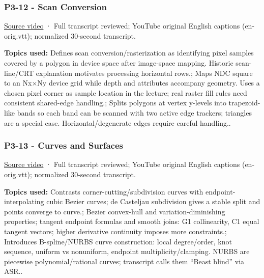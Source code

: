 \subsubsection{P3-12 - Scan Conversion}\label{04-visual-computing-ii-ch036-p3-12---scan-conversion}

\hypertarget{04-visual-computing-ii-ch036-p3-12---scan-conversion}{}

\href{https://www.youtube.com/watch?v=23HEwdcphg4}{Source video} · Full transcript reviewed; YouTube original English captions (en-orig.vtt); normalized 30-second transcript.

\textbf{Topics used:} Defines scan conversion/rasterization as identifying pixel samples covered by a polygon in device space after image-space mapping. Historic scan-line/CRT explanation motivates processing horizontal rows.; Maps NDC square to an Nx×Ny device grid while depth and attributes accompany geometry. Uses a chosen pixel corner as sample location in the lecture; real raster fill rules need consistent shared-edge handling.; Splits polygons at vertex y-levels into trapezoid-like bands so each band can be scanned with two active edge trackers; triangles are a special case. Horizontal/degenerate edges require careful handling..

\subsubsection{P3-13 - Curves and Surfaces}\label{04-visual-computing-ii-ch036-p3-13---curves-and-surfaces}

\hypertarget{04-visual-computing-ii-ch036-p3-13---curves-and-surfaces}{}

\href{https://www.youtube.com/watch?v=FTg1DUr7bhY}{Source video} · Full transcript reviewed; YouTube original English captions (en-orig.vtt); normalized 30-second transcript.

\textbf{Topics used:} Contrasts corner-cutting/subdivision curves with endpoint-interpolating cubic Bezier curves; de Casteljau subdivision gives a stable split and points converge to curve.; Bezier convex-hull and variation-diminishing properties; tangent endpoint formulas and smooth joins: G1 collinearity, C1 equal tangent vectors; higher derivative continuity imposes more constraints.; Introduces B-spline/NURBS curve construction: local degree/order, knot sequence, uniform vs nonuniform, endpoint multiplicity/clamping. NURBS are piecewise polynomial/rational curves; transcript calls them ``Beast blind'' via ASR..

